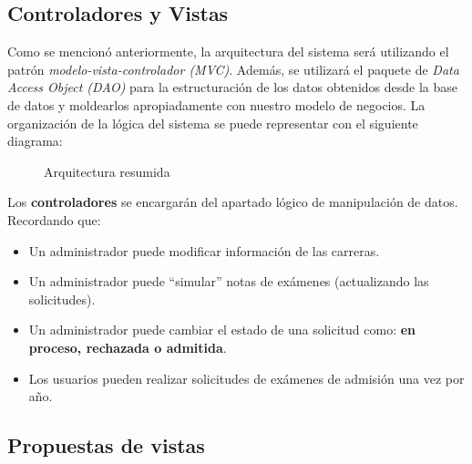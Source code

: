 \documentclass[12pt,a4paper]{article}
\begin{document}
\subsection{Controladores y Vistas}

Como se mencionó anteriormente, la arquitectura del sistema será utilizando el patrón \textit{modelo-vista-controlador (MVC)}. Además, se utilizará el paquete de \textit{Data Access Object (DAO)} para la estructuración de los datos obtenidos desde la base de datos y moldearlos apropiadamente con nuestro modelo de negocios. La organización de la lógica del sistema se puede representar con el siguiente diagrama:

\begin{figure}[H]
  \centering
  \caption{Arquitectura resumida}
  \label{fig:arqResumidaSinDetalle}
\end{figure}

Los \textbf{controladores} se encargarán del apartado lógico de manipulación de datos. Recordando que:
\begin{itemize}
  \item Un administrador puede modificar información de las carreras.
  \item Un administrador puede ``simular'' notas de exámenes (actualizando las solicitudes).
  \item Un administrador puede cambiar el estado de una solicitud como: \textbf{en proceso, rechazada o admitida}.
  \item Los usuarios pueden realizar solicitudes de exámenes de admisión una vez por año.
\end{itemize}

\subsection{Propuestas de vistas}
\end{document}
